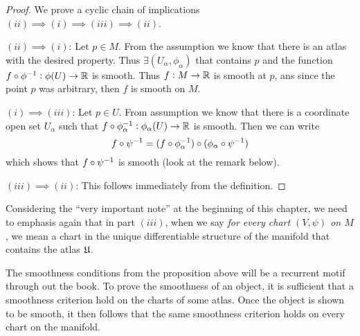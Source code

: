 \begin{proof}
	We prove a cyclic chain of implications $ (ii)\implies (i) \implies (iii) \implies (ii) $.
	
	\noindent $ (ii) \implies (i) $: Let $ p \in M $. From the assumption we know that there is an atlas with the desired property. Thus $ \exists (U_\alpha,\phi_\alpha)  $ that contains $ p $ and the function $ f\circ\phi^{-1}: \phi(U) \to \mathbb{R} $ is smooth. 
	Thus $ f:M\to \mathbb{R} $ is smooth at $ p $, ans since the point $ p $ was arbitrary, then $ f $ is smooth on $ M $.
	
	\noindent $ (i) \implies (iii) $: Let $ p \in U $. From assumption we know that there is a coordinate open set $ U_\alpha $ such that $ f \circ \phi_\alpha^{-1}: \phi_\alpha(U)\to \mathbb{R} $ is smooth. Then we can write
	\[ f\circ\psi^{-1} = (f\circ\phi_\alpha^{-1})\circ(\phi_\alpha \circ \psi^{-1}) \]
	which shows that $ f\circ\psi^{-1}  $ is smooth (look at the remark below).
	
	\noindent $ (iii) \implies (ii) $: This follows immediately from the definition.
\end{proof}


\begin{remark}
	Considering the ``very important note'' at the beginning of this chapter, we need to emphasis again that in part $ (iii) $, when we say \emph{for every chart $ (V,\psi) $ on $ M $}, we mean a chart in the unique differentiable structure of the manifold that contains the atlas $ \frak{U} $.
\end{remark}

\begin{observation}[From W. Tu]
	The smoothness conditions from the proposition above will be a recurrent motif through out the book. To prove the smoothness of an object, it is sufficient that a smoothness criterion hold on the charts of some atlas. Once the object is shown to be smooth, it then follows that the same smoothness criterion holds on every chart on the manifold.
\end{observation}


